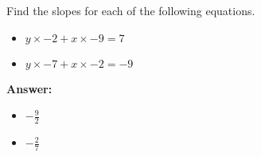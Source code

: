 Find the slopes for each of the following equations. \begin{itemize}\item \( y \times -2 + x \times -9 = 7 \)\item \( y \times -7 + x \times -2 = -9 \)\end{itemize}

        \textbf{Answer:} \begin{itemize}\item \( -\frac{9}{2} \)\item \( -\frac{2}{7} \)\end{itemize}
